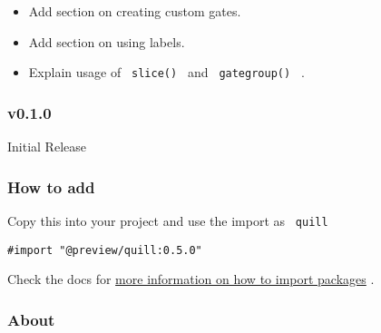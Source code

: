 \begin{itemize}
  \begin{itemize}
  \tightlist
  \item
    Add section on creating custom gates.
  \item
    Add section on using labels.
  \item
    Explain usage of \texttt{\ slice()\ } and \texttt{\ gategroup()\ } .
  \end{itemize}
\end{itemize}

\subsubsection{v0.1.0}\label{v0.1.0}

Initial Release

\subsubsection{How to add}\label{how-to-add}

Copy this into your project and use the import as \texttt{\ quill\ }

\begin{verbatim}
#import "@preview/quill:0.5.0"
\end{verbatim}



Check the docs for
\href{https://typst.app/docs/reference/scripting/\#packages}{more
information on how to import packages} .

\subsubsection{About}\label{about}

